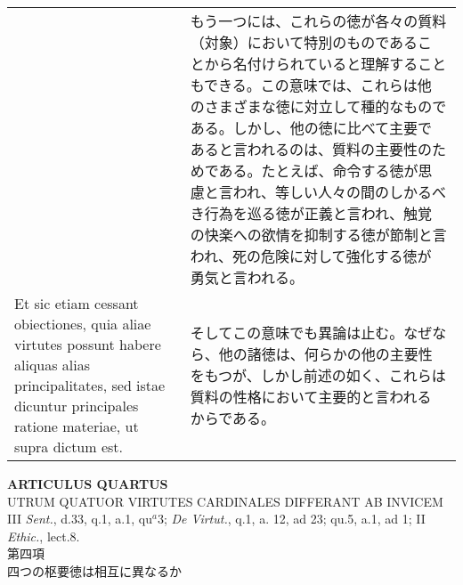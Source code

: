 \documentclass[10pt]{jsarticle}
\begin{document}
\begin{longtable}{p{21em}p{21em}}
&

もう一つには、これらの徳が各々の質料（対象）において特別のものであるこ
とから名付けられていると理解することもできる。この意味では、これらは他
のさまざまな徳に対立して種的なものである。しかし、他の徳に比べて主要で
あると言われるのは、質料の主要性のためである。たとえば、命令する徳が思
慮と言われ、等しい人々の間のしかるべき行為を巡る徳が正義と言われ、触覚
の快楽への欲情を抑制する徳が節制と言われ、死の危険に対して強化する徳が
勇気と言われる。
 
 
\\

 Et sic etiam cessant obiectiones, quia aliae virtutes possunt habere
 aliquas alias principalitates, sed istae dicuntur principales ratione
 materiae, ut supra dictum est.
 
&

そしてこの意味でも異論は止む。なぜなら、他の諸徳は、何らかの他の主要性
をもつが、しかし前述の如く、これらは質料の性格において主要的と言われる
からである。
 
\\
\end{longtable}
\newpage
{}
\begin{center}
{\Large {\bf ARTICULUS QUARTUS}}\\
{\large UTRUM QUATUOR VIRTUTES CARDINALES DIFFERANT AB INVICEM}\\
{\footnotesize III {\itshape Sent.}, d.33, q.1, a.1, qu$^{a}$3; {\itshape De Virtut.}, q.1, a. 12, ad 23; qu.5, a.1, ad 1; II {\itshape Ethic.}, lect.8.}\\
{\Large 第四項\\四つの枢要徳は相互に異なるか}
\end{center}
\end{document}
